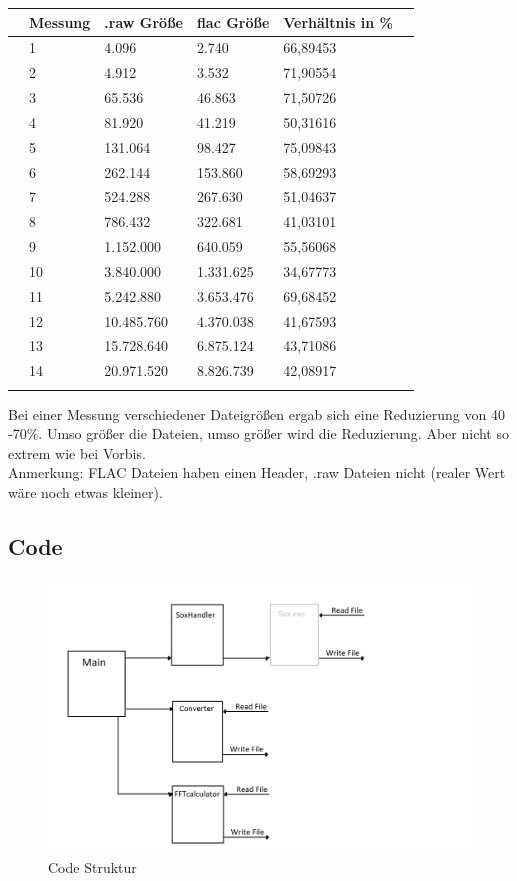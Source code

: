 \documentclass{article}
\begin{document}
				\begin{tabularx}{\textwidth}{p{0\textwidth}l|l|l|l|l}
		
		&Messung& .raw Größe & flac Größe & Verhältnis in \% \\
		\hline
		&1 &4.096 &2.740 & 66,89453 & \\
		\hline
		&2 &4.912 &3.532 & 71,90554 & \\
		\hline
		&3 &65.536 &46.863 & 71,50726 & \\
		\hline
		&4 &81.920 &41.219 & 50,31616 & \\
		\hline
		&5 &131.064 &98.427 & 75,09843 & \\
		\hline
		&6 &262.144 &153.860 & 58,69293 & \\
		\hline
		&7 &524.288 &267.630 & 51,04637 & \\
		\hline
		&8 &786.432 &322.681 & 41,03101 & \\
		\hline
		&9 &1.152.000 &640.059 & 55,56068 & \\
		\hline
		&10 &3.840.000 &1.331.625 & 34,67773 & \\
		\hline
		&11 &5.242.880 &3.653.476 & 69,68452 & \\
		\hline
		&12 &10.485.760 &4.370.038 & 41,67593 & \\
		\hline
		&13 &15.728.640 &6.875.124 & 43,71086 & \\
		\hline
		&14 &20.971.520 &8.826.739 & 42,08917 & \\
		
		& & 
	\end{tabularx}
	Bei einer Messung verschiedener Dateigrößen ergab sich eine Reduzierung von 40 -70\%. Umso größer die Dateien, umso größer wird die Reduzierung. Aber nicht so extrem wie bei Vorbis.\\
	Anmerkung: FLAC Dateien haben einen Header, .raw Dateien nicht (realer Wert wäre noch etwas kleiner).
	
		
	\subsection{Code}
	
		\begin{figure}
			\includegraphics[scale=0.2]{Bilder/blockschaltbild1.png}
			\centering
			\vspace{0 cm}
			\caption{Code Struktur}
			\label{fig18}	
		\end{figure}
	
\end{document}
